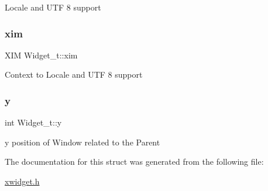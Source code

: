 Locale and U\+TF 8 support \mbox{\label{structWidget__t_a81aa76d336043a7230844d09a92113e2}} 
\subsubsection{\texorpdfstring{xim}{xim}}
{\footnotesize\ttfamily X\+IM Widget\+\_\+t\+::xim}

Context to Locale and U\+TF 8 support \mbox{\label{structWidget__t_acb9402de44e47837e1821b93fc052b38}} 
\subsubsection{\texorpdfstring{y}{y}}
{\footnotesize\ttfamily int Widget\+\_\+t\+::y}

y position of Window related to the Parent 

The documentation for this struct was generated from the following file\+:\begin{DoxyCompactItemize}
\item 
\hyperlink{xwidget_8h}{xwidget.\+h}\end{DoxyCompactItemize}

